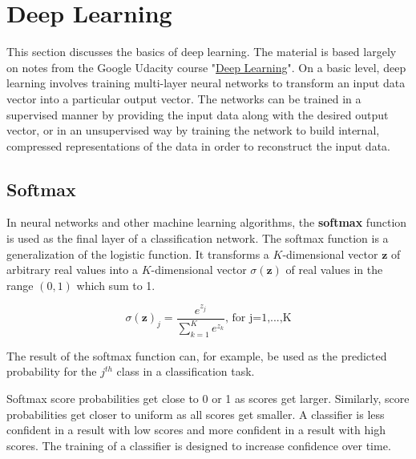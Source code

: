 \section{Deep Learning}

This section discusses the basics of deep learning. The material is based largely on notes from the Google Udacity course "\href{https://www.udacity.com/course/deep-learning--ud730}{Deep Learning}". On a basic level, deep learning involves training multi-layer neural networks to transform an input data vector into a particular output vector. The networks can be trained in a supervised manner by providing the input data along with the desired output vector, or in an unsupervised way by training the network to build internal, compressed representations of the data in order to reconstruct the input data.

\subsection{Softmax}

In neural networks and other machine learning algorithms, the \textbf{softmax} function is used as the final layer of a classification network. The softmax function is a generalization of the logistic function. It transforms a $K$-dimensional vector $\mathbf{z}$ of arbitrary real values into a $K$-dimensional vector $\sigma(\mathbf{z})$ of real values in the range $(0,1)$ which sum to 1. 

\begin{equation}
\sigma(\mathbf{z})_{j} = \frac{e^{z_{j}}}{\sum_{k=1}^{K} e^{z_{k}}} \text{, for j=1,...,K}
\end{equation}

The result of the softmax function can, for example, be used as the predicted probability for the $j^{th}$ class in a classification task.

Softmax score probabilities get close to 0 or 1 as scores get larger. Similarly, score probabilities get closer to uniform as all scores get smaller. A classifier is less confident in a result with low scores and more confident in a result with high scores. The training of a classifier is designed to increase confidence over time. 

